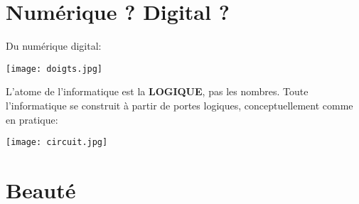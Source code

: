 \documentclass[french]{beamer}
\begin{document}
\section{Numérique ? Digital ?}


\begin{frame}
    Du numérique digital:
  \begin{center}
    \texttt{[image: doigts.jpg]}
  \end{center}
\end{frame}



\begin{frame}
L'atome de l'informatique est la \textbf{LOGIQUE}, pas les nombres.
Toute l'informatique se construit à partir de portes logiques,
conceptuellement comme en pratique:
\end{frame}

\begin{frame}

   \begin{center}
     \texttt{[image: circuit.jpg]}
   \end{center}
 \end{frame}


\section{Beauté}
\end{document}
